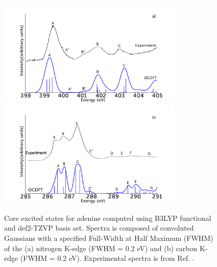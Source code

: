 \documentclass[8.5pt,twoside,twocolumn]{article}
\begin{document}
 \begin{figure}[!t]
\centering
\includegraphics[width=8.8cm]{AdenineNKexperiment.png} \\
\includegraphics[width=8.8cm]{AdenineCKexperiment.png}
\caption{Core excited states for adenine computed using B3LYP functional and def2-TZVP basis set. Spectra is composed of convoluted Gaussians with a specified Full-Width at Half Maximum (FWHM) of the (a) nitrogen K-edge (FWHM = 0.2 eV) and (b) carbon K-edge (FWHM = 0.2 eV). Experimental spectra is from Ref. .}
\label{figure:Adenine}
\end{figure} 
\end{document}
